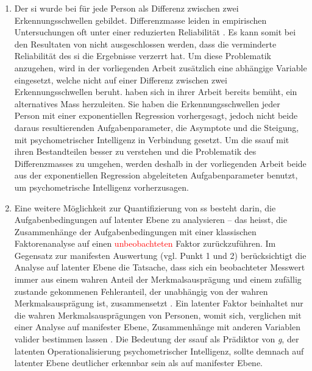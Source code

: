 \documentclass[11pt, twoside, a4paper]{book}		%
\begin{document}
\begin{enumerate}
	\item Der \gls{si} wurde bei \citet{Melnick2013} für jede Person als Differenz zwischen zwei Erkennungsschwellen gebildet. Differenzmasse leiden in empirischen Untersuchungen oft unter einer reduzierten Reliabilität \citep[][S. 145]{Murphy2005}. Es kann somit bei den Resultaten von \citeauthor{Melnick2013} nicht ausgeschlossen werden, dass die verminderte Reliabilität des \gls{si} die Ergebnisse verzerrt hat. Um diese Problematik anzugehen, wird in der vorliegenden Arbeit zusätzlich eine abhängige Variable eingesetzt, welche nicht auf einer Differenz zwischen zwei Erkennungsschwellen beruht. \citeauthor{Melnick2013} haben sich in ihrer Arbeit bereits bemüht, ein alternatives Mass herzuleiten. Sie haben die Erkennungsschwellen jeder Person mit einer exponentiellen Regression vorhergesagt, jedoch nicht beide daraus resultierenden Aufgabenparameter, die Asymptote und die Steigung, mit psychometrischer Intelligenz in Verbindung gesetzt. Um die \gls{ssauf} mit ihren Bestandteilen besser zu verstehen und die Problematik des Differenzmasses zu umgehen, werden deshalb in der vorliegenden Arbeit beide aus der exponentiellen Regression abgeleiteten Aufgabenparameter benutzt, um psychometrische Intelligenz vorherzusagen. 

	\item Eine weitere Möglichkeit zur Quantifizierung von \gls{ss} besteht darin, die Aufgabenbedingungen auf latenter Ebene zu analysieren -- das heisst, die Zusammenhänge der Aufgabenbedingungen mit einer klassischen Faktorenanalyse auf einen \textcolor{red}{unbeobachteten} Faktor zurückzuführen. Im Gegensatz zur manifesten Auswertung (vgl. Punkt 1 und 2) berücksichtigt die Analyse auf latenter Ebene die Tatsache, dass sich ein beobachteter Messwert immer aus einem wahren Anteil der Merkmalsausprägung und einem zufällig zustande gekommenen Fehleranteil, der unabhängig von der wahren Merkmalsausprägung ist, zusammensetzt \citep{Moosbrugger2007}. Ein latenter Faktor beinhaltet nur die wahren Merkmalsausprägungen von Personen, womit sich, verglichen mit einer Analyse auf manifester Ebene, Zusammenhänge mit anderen Variablen valider bestimmen lassen \citep[S. 9]{Kline2011}. Die Bedeutung der \gls{ssauf} als Prädiktor von \textit{g}, der latenten Operationalisierung psychometrischer Intelligenz, sollte demnach auf latenter Ebene deutlicher erkennbar sein als auf manifester Ebene.


\end{enumerate}
\end{document}
